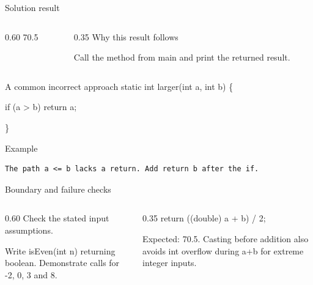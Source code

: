 \documentclass[10pt,aspectratio=169]{beamer}
\begin{document}
\begin{frame}[fragile,t]{Solution result}
\begin{columns}[T,onlytextwidth]\begin{column}{0.60\textwidth}
70.5
\end{column}\begin{column}{0.35\textwidth}\small
Why this result follows

Call the method from main and print the returned result.
\end{column}\end{columns}
\end{frame}

\begin{frame}[fragile,t]{A common incorrect approach}
static int larger(int a, int b) \{\par   if (a \textgreater{} b) return a;\par \}
\vspace{1mm}\begin{block}{Example}
\begin{lstlisting}
The path a <= b lacks a return. Add return b after the if.
\end{lstlisting}
\end{block}
\end{frame}

\begin{frame}[fragile,t]{Boundary and failure checks}
\begin{columns}[T,onlytextwidth]\begin{column}{0.60\textwidth}
Check the stated input assumptions.

Write isEven(int n) returning boolean. Demonstrate calls for -2, 0, 3 and 8.
\end{column}\begin{column}{0.35\textwidth}\small
return ((double) a + b) / 2;\par Expected: 70.5. Casting before addition also avoids int overflow during a+b for extreme integer inputs.
\end{column}\end{columns}
\end{frame}
\end{document}
